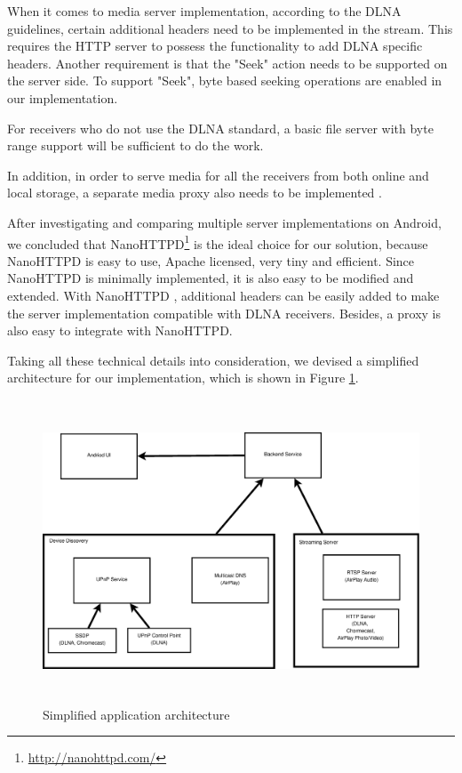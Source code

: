 When it comes to media server implementation, according to the DLNA guidelines,
certain additional headers need to be implemented in the stream. This
requires the HTTP server to possess the functionality to add DLNA specific
headers. Another requirement is that the "Seek" action needs to be supported on the server side. To support "Seek", byte based seeking operations are enabled in our implementation.

For receivers who do not use the DLNA standard, a basic file server with byte
range support will be sufficient to do the work.

In addition, in order to serve media for all the receivers from both online and
local storage, a separate media proxy also needs to be implemented
\cite{ipv6} \cite{DLNA_proxy2}.

After investigating and comparing multiple server implementations on Android, we
concluded that NanoHTTPD\footnote{\url{http://nanohttpd.com/}} is the ideal
choice for our solution, because NanoHTTPD is easy to use, Apache licensed,
very tiny and efficient. Since NanoHTTPD is minimally implemented, it is also
easy to be modified and extended. With NanoHTTPD , additional headers can be
easily added to make the server implementation compatible with DLNA receivers.
Besides, a proxy is also easy to integrate with  NanoHTTPD.

Taking all these technical details into consideration, we devised a simplified
architecture for our implementation, which is shown in Figure \ref{chart3}.

\begin{figure}[htb]
\centering \includegraphics[height=9cm]{charts/chart3}
\caption{Simplified application architecture\label{chart3}}
\end{figure}

